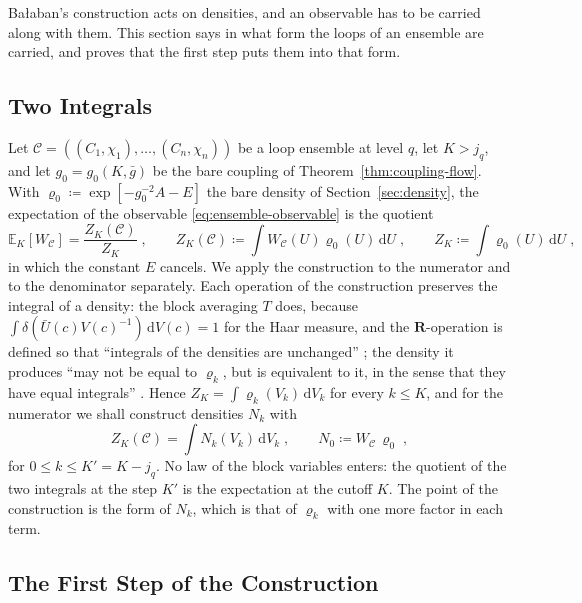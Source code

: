 \documentclass[11pt]{preprint}
\newcommand{\dd}{\mathrm{d}}
\numberwithin{equation}{section}
\theoremstyle{definition}
\theoremstyle{remark}
\theoremstyle{plain}
\begin{document}
Ba{\l}aban's construction acts on densities, and an observable has to be carried along with them. This section says in what form the loops of an ensemble are carried, and proves that the first step puts them into that form.

\subsection{Two Integrals}\label{sec:two-integrals}

Let $\mathcal C = ((C_1, \chi_1), \dots, (C_n, \chi_n))$ be a loop ensemble at level $q$, let $K > j_q$, and let $g_0 = g_0(K, \bar g)$ be the bare coupling of Theorem~\ref{thm:coupling-flow}. With $\varrho_0 \coloneqq \exp[-g_0^{-2}A - E]$ the bare density of Section~\ref{sec:density}, the expectation of the observable \eqref{eq:ensemble-observable} is the quotient
\begin{equation}\label{eq:two-integrals}
    \mathbb E_K[W_{\mathcal C}] = \frac{Z_K(\mathcal C)}{Z_K}\;,
    \qquad
    Z_K(\mathcal C) \coloneqq \int W_{\mathcal C}(U)\varrho_0(U)\,\dd U\;,
    \qquad
    Z_K \coloneqq \int\varrho_0(U)\,\dd U\;,
\end{equation}
in which the constant $E$ cancels. We apply the construction to the numerator and to the denominator separately. Each operation of the construction preserves the integral of a density: the block averaging $T$ does, because $\int\delta(\bar U(c)V(c)^{-1})\,\dd V(c) = 1$ for the Haar measure, and the $\mathbf R$-operation is defined so that ``integrals of the densities are unchanged'' \cite[p.~176]{BalabanLFR1}; the density it produces ``may not be equal to $\varrho_k$, but is equivalent to it, in the sense that they have equal integrals'' \cite[p.~200]{BalabanLFR1}. Hence $Z_K = \int\varrho_k(V_k)\,\dd V_k$ for every $k \leq K$, and for the numerator we shall construct densities $N_k$ with
\begin{equation}\label{eq:numerator-integral}
    Z_K(\mathcal C) = \int N_k(V_k)\,\dd V_k\;,
    \qquad
    N_0 \coloneqq W_{\mathcal C}\,\varrho_0\;,
\end{equation}
for $0 \leq k \leq K' = K - j_q$. No law of the block variables enters: the quotient of the two integrals at the step $K'$ is the expectation at the cutoff $K$. The point of the construction is the form of $N_k$, which is that of $\varrho_k$ with one more factor in each term.

\subsection{The First Step of the Construction}\label{sec:balaban-first-step}
\end{document}
